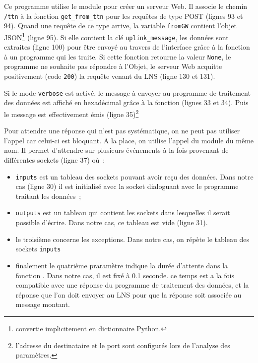          \vspace{1em}

 
 Ce programme utilise le module  pour créer un serveur Web. Il associe le chemin \texttt{/ttn} à la fonction \texttt{get\_from\_ttn} pour les requêtes de type POST (lignes 93 et 94). Quand une requête de ce type arrive, la variable 
\texttt{fromGW} contient l'objet JSON\footnote{convertie implicitement en dictionnaire Python.} (ligne 95). Si elle contient la clé \texttt{uplink\_message}, les données sont extraites (ligne 100) pour être envoyé au travers de l'interface \textit{}  grâce à la fonction \texttt{} à un programme qui les traite. Si cette fonction retourne la valeur \texttt{None}, le programme ne souhaite pas répondre à l'Objet, le serveur Web acquitte positivement (code \texttt{200}) la requête venant du LNS (ligne 130 et 131).

 \label{chap—forward-data}


Si le mode \texttt{verbose} est activé, le message à envoyer au programme de traitement des données est affiché en hexadécimal grâce à la fonction  (lignes 33 et 34). Puis le message est effectivement émis (ligne 35)\footnote{l'adresse du destinataire et le port sont configurés lors de l'analyse des paramètres.}

Pour attendre une réponse qui n'est pas systématique, on ne peut pas utiliser l'appel  car celui-ci est bloquant. A la place, on utilise l'appel  du module du même nom. Il permet d'attendre sur plusieurs événements à la fois provenant de différentes sockets (ligne 37) où~:
\begin{itemize}
    \item \texttt{inputs} est un tableau des sockets pouvant avoir reçu des données. Dans notre cas (ligne 30) il est initialisé avec la socket dialoguant avec le programme traitant les données~;
    \item \texttt{outputs} est un tableau qui contient les sockets dans lesquelles il serait possible d'écrire. Dans notre cas, ce tableau est vide (ligne 31).
    \item le troisième concerne les exceptions. Dans notre cas, on répète le tableau des sockets \texttt{inputs}
    \item finalement le quatrième praramètre indique la durée d'attente dans la fonction . Dans notre cas, il est fixé à 0.1 seconde. ce temps est a la fois compatible avec une réponse du programme de traitement des données, et la réponse que l'on doit envoyer au LNS pour que la réponse soit associée au message montant.
\end{itemize}

